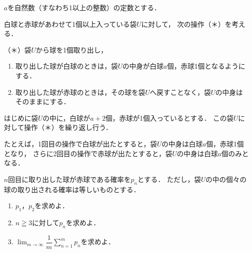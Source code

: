 \documentclass[../../main.tex]{subfiles}
\begin{document}
$a$を自然数（すなわち1以上の整数）の定数とする．

白球と赤球があわせて1個以上入っている袋$U$に対して，
次の操作（＊）を考える．

（＊）袋$U$から球を1個取り出し，
\begin{enumerate}
  \item 取り出した球が白球のときは，袋$U$の中身が白球$a$個，赤球1個となるようにする．
  \item 取り出した球が赤球のときは，その球を袋$U$へ戻すことなく，袋$U$の中身はそのままにする．
\end{enumerate}
はじめに袋$U$の中に，白球が$a+2$個，赤球が1個入っているとする．
この袋$U$に対して操作（＊）を繰り返し行う．

たとえば，1回目の操作で白球が出たとすると，袋$U$の中身は白球$a$個，赤球1個となり，
さらに2回目の操作で赤球が出たとすると，袋$U$の中身は白球$a$個のみとなる．

$n$回目に取り出した球が赤球である確率を$p_n$とする．
ただし，袋$U$の中の個々の球の取り出される確率は等しいものとする．
\begin{enumerate}
  \item $p_1$，$p_2$を求めよ．
  \item $n\geqq3$に対して$p_n$を求めよ．
  \item $\displaystyle\lim_{m\to\infty}\dfrac{1}{m}\sum_{n=1}^mp_n$を求めよ．
\end{enumerate}
\end{document}
